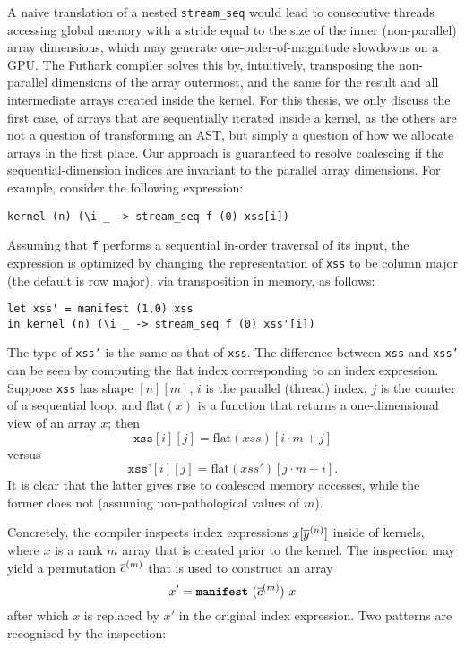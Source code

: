 A naive translation of a nested \lstinline{stream_seq} would lead to
consecutive threads accessing global memory with a stride equal to the
size of the inner (non-parallel) array dimensions, which may generate
one-order-of-magnitude slowdowns on a GPU.
%
The Futhark compiler solves this by, intuitively, transposing the
non-parallel dimensions of the array outermost, and the same for the
result and all intermediate arrays created inside the kernel.  For
this thesis, we only discuss the first case, of arrays that are
sequentially iterated inside a kernel, as the others are not a
question of transforming an AST, but simply a question of how we
allocate arrays in the first place.  Our approach is guaranteed to
resolve coalescing if the sequential-dimension indices are invariant
to the parallel array dimensions. For example, consider the following
expression:
\begin{lstlisting}[numbers=none]
kernel (n) (\i _ -> stream_seq f (0) xss[i])
\end{lstlisting}
Assuming that
\lstinline{f} performs a sequential in-order traversal of its input,
the expression is optimized by changing the representation of
\texttt{xss} to be column major (the default is row major), via
transposition in memory, as follows:

\begin{lstlisting}[numbers=none]
let xss' = manifest (1,0) xss
in kernel (n) (\i _ -> stream_seq f (0) xss'[i])
\end{lstlisting}

The type of \texttt{xss'} is the same as that of \texttt{xss}.  The
difference between \texttt{xss} and \texttt{xss'} can be seen by
computing the flat index corresponding to an index expression.
Suppose \texttt{xss} has shape $[n][m]$, $i$ is the parallel (thread)
index, $j$ is the counter of a sequential loop, and $\textrm{flat}(x)$
is a function that returns a one-dimensional view of an array $x$;
then
\[
  \texttt{xss}[i][j] = \textrm{flat}(xss)[i\cdot{}m+j]
\]
versus
\[
  \texttt{xss'}[i][j] = \textrm{flat}(xss')[j\cdot{}m+i].
\]
It is clear that the latter gives rise to coalesced memory accesses,
while the former does not (assuming non-pathological values of $m$).

Concretely, the compiler inspects index expressions $x[\overline{y}^{(n)}]$
inside of kernels, where $x$ is a rank $m$ array that is created prior
to the kernel.  The inspection may yield a permutation $\overline{c}^{(m)}$
that is used to construct an array
\[
  x' = \mbox{\texttt{\bfseries{manifest}}}~(\overline{c}^{(m)})~x
\]
after which $x$ is replaced by $x'$ in the original index expression.
Two patterns are recognised by the inspection:

